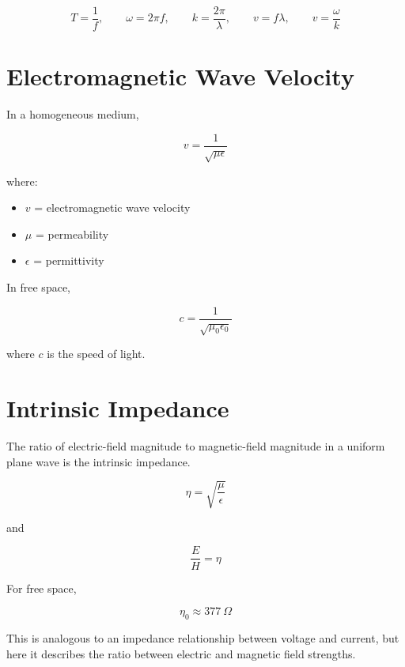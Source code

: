 \documentclass[11pt]{article}
\begin{document}
\[
\boxed{
T=\frac{1}{f},
\qquad
\omega=2\pi f,
\qquad
k=\frac{2\pi}{\lambda},
\qquad
v=f\lambda,
\qquad
v=\frac{\omega}{k}
}
\]



\section{Electromagnetic Wave Velocity}

In a homogeneous medium,

\[
\boxed{
v
=
\frac{1}{\sqrt{\mu\epsilon}}
}
\]

where:

\begin{itemize}
    \item $v$ = electromagnetic wave velocity
    \item $\mu$ = permeability
    \item $\epsilon$ = permittivity
\end{itemize}

In free space,

\[
\boxed{
c
=
\frac{1}{\sqrt{\mu_0\epsilon_0}}
}
\]

where $c$ is the speed of light.



\section{Intrinsic Impedance}

The ratio of electric-field magnitude to magnetic-field magnitude in a uniform plane wave is the intrinsic impedance.

\[
\boxed{
\eta
=
\sqrt{\frac{\mu}{\epsilon}}
}
\]

and

\[
\boxed{
\frac{E}{H}
=
\eta
}
\]

For free space,

\[
\boxed{
\eta_0
\approx
377~\Omega
}
\]

This is analogous to an impedance relationship between voltage and current, but here it describes the ratio between electric and magnetic field strengths.


\end{document}
